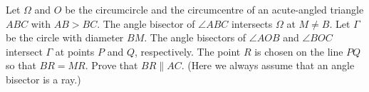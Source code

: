Let $\Omega$ and $O$ be the circumcircle and the circumcentre of an acute-angled triangle $ABC$ with $AB > BC$. The angle bisector of $\angle ABC$ intersects $\Omega$ at $M \neq B$. Let $\Gamma$ be the circle with diameter $BM$. The angle bisectors of $\angle AOB$ and $\angle BOC$ intersect $\Gamma$ at points $P$ and $Q$, respectively. The point $R$ is chosen on the line $PQ$ so that $BR = MR$. Prove that $BR \parallel AC$. (Here we always assume that an angle bisector is a ray.)
